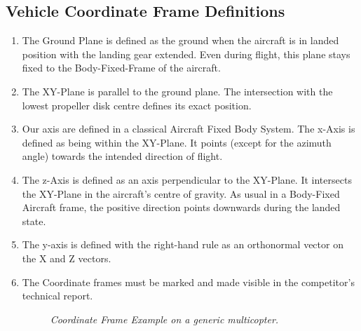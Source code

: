 \documentclass{article}
\begin{document}
\subsection{Vehicle Coordinate Frame Definitions}
\begin{enumerate}
  \item The Ground Plane is defined as the ground when the aircraft is in landed position with the landing gear extended. Even during flight, this plane stays fixed to the Body-Fixed-Frame of the aircraft.
  \item The XY-Plane is parallel to the ground plane. The intersection with the lowest propeller disk centre defines its exact position.
  \item Our axis are defined in a classical Aircraft Fixed Body System. The x-Axis is defined as being within the XY-Plane. It points (except for the azimuth angle) towards the intended direction of flight.
  \item The z-Axis is defined as an axis perpendicular to the XY-Plane. It intersects the XY-Plane in the aircraft's centre of gravity. As usual in a Body-Fixed Aircraft frame, the positive direction points downwards during the landed state.
  \item The y-axis is defined with the right-hand rule as an orthonormal vector on the X and Z vectors.
  \item The Coordinate frames must be marked and made visible in the competitor's technical report. 
  
  \begin{figure}[h!]
    \centering
   \caption{\textit{Coordinate Frame Example on a generic multicopter.}}
   \end{figure}
\end{enumerate}
\end{document}
